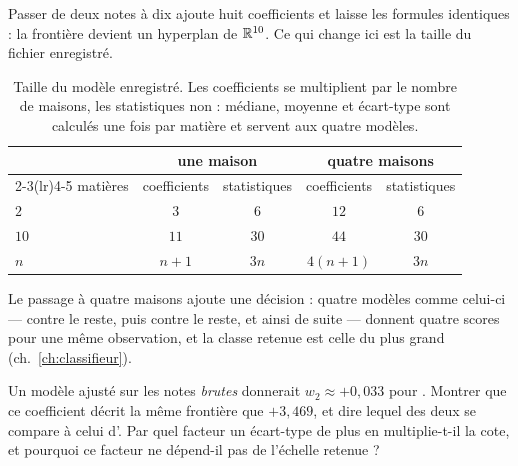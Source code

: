 Passer de deux notes à dix ajoute huit coefficients et laisse les formules
identiques : la frontière devient un hyperplan de $\mathbb{R}^{10}$. Ce qui change ici
est la taille du fichier enregistré.

\begin{table}[htbp]
\centering
\begin{tabular}{lcccc}
\toprule
 & \multicolumn{2}{c}{\textbf{une maison}} & \multicolumn{2}{c}{\textbf{quatre maisons}} \\
\cmidrule(lr){2-3}\cmidrule(lr){4-5}
matières & coefficients & statistiques & coefficients & statistiques \\
\midrule
$2$  & $3$  & $6$  & $12$ & $6$  \\
$10$ & $11$ & $30$ & $44$ & $30$ \\
$n$  & $n+1$ & $3n$ & $4(n+1)$ & $3n$ \\
\bottomrule
\end{tabular}
\caption{Taille du modèle enregistré. Les coefficients se multiplient par le
nombre de maisons, les statistiques non : médiane, moyenne et écart-type sont
calculés une fois par matière et servent aux quatre modèles.}
\label{tab:taille}
\end{table}

Le passage à quatre maisons ajoute une décision : quatre modèles comme celui-ci
--- \Gryf contre le reste, puis \Huff contre le reste, et ainsi de suite ---
donnent quatre scores pour une même observation, et la classe retenue est celle
du plus grand (ch.~\ref{ch:classifieur}).

\begin{exercice}
Un modèle ajusté sur les notes \emph{brutes} donnerait $w_2\approx+0{,}033$ pour
\Runes. Montrer que ce coefficient décrit la même frontière que $+3{,}469$, et
dire lequel des deux se compare à celui d'\Herb. Par quel facteur un écart-type
de plus en \Runes multiplie-t-il la cote, et pourquoi ce facteur ne dépend-il pas
de l'échelle retenue ?
\end{exercice}
